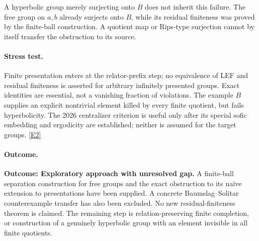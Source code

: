 \documentclass[11pt,a4paper]{article}
\newcommand{\eref}[2]{\hyperlink{extra:#1:#2}{[E#2]}}
\numberwithin{equation}{section}
\begin{document}
A hyperbolic group merely surjecting onto $B$ does not inherit this failure.
The free group on $a,b$ already surjects onto $B$, while its residual
finiteness was proved by the finite-ball construction. A quotient map or
Rips-type surjection cannot by itself transfer the obstruction to its source.

\paragraph{Stress test.}
Finite presentation enters at the relator-prefix step; no equivalence of
LEF and residual finiteness is asserted for arbitrary infinitely presented
groups. Exact identities are essential, not a vanishing fraction of
violations. The example $B$ supplies an explicit nontrivial element killed
by every finite quotient, but fails hyperbolicity. The 2026 centralizer
criterion is useful only after its special sofic embedding and ergodicity
are established; neither is assumed for the target groups. \eref{30006750}{2}

\paragraph{Outcome.}
\textbf{Outcome: Exploratory approach with unresolved gap.}
A finite-ball separation construction for free groups and the exact obstruction
to its naïve extension to presentations have been supplied. A concrete
Baumslag--Solitar counterexample transfer has also been excluded. No new
residual-finiteness theorem is claimed. The remaining step is relation-preserving
finite completion, or construction of a genuinely hyperbolic group with an
element invisible in all finite quotients.

\end{document}
